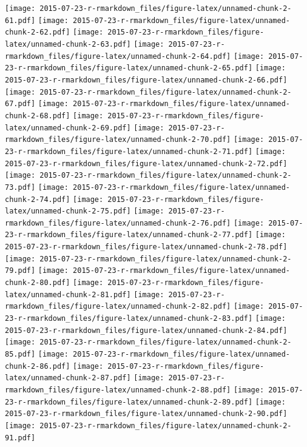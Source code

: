\documentclass[
]{article}
\begin{document}
\texttt{[image: 2015-07-23-r-rmarkdown\_files/figure-latex/unnamed-chunk-2-61.pdf]}
\texttt{[image: 2015-07-23-r-rmarkdown\_files/figure-latex/unnamed-chunk-2-62.pdf]}
\texttt{[image: 2015-07-23-r-rmarkdown\_files/figure-latex/unnamed-chunk-2-63.pdf]}
\texttt{[image: 2015-07-23-r-rmarkdown\_files/figure-latex/unnamed-chunk-2-64.pdf]}
\texttt{[image: 2015-07-23-r-rmarkdown\_files/figure-latex/unnamed-chunk-2-65.pdf]}
\texttt{[image: 2015-07-23-r-rmarkdown\_files/figure-latex/unnamed-chunk-2-66.pdf]}
\texttt{[image: 2015-07-23-r-rmarkdown\_files/figure-latex/unnamed-chunk-2-67.pdf]}
\texttt{[image: 2015-07-23-r-rmarkdown\_files/figure-latex/unnamed-chunk-2-68.pdf]}
\texttt{[image: 2015-07-23-r-rmarkdown\_files/figure-latex/unnamed-chunk-2-69.pdf]}
\texttt{[image: 2015-07-23-r-rmarkdown\_files/figure-latex/unnamed-chunk-2-70.pdf]}
\texttt{[image: 2015-07-23-r-rmarkdown\_files/figure-latex/unnamed-chunk-2-71.pdf]}
\texttt{[image: 2015-07-23-r-rmarkdown\_files/figure-latex/unnamed-chunk-2-72.pdf]}
\texttt{[image: 2015-07-23-r-rmarkdown\_files/figure-latex/unnamed-chunk-2-73.pdf]}
\texttt{[image: 2015-07-23-r-rmarkdown\_files/figure-latex/unnamed-chunk-2-74.pdf]}
\texttt{[image: 2015-07-23-r-rmarkdown\_files/figure-latex/unnamed-chunk-2-75.pdf]}
\texttt{[image: 2015-07-23-r-rmarkdown\_files/figure-latex/unnamed-chunk-2-76.pdf]}
\texttt{[image: 2015-07-23-r-rmarkdown\_files/figure-latex/unnamed-chunk-2-77.pdf]}
\texttt{[image: 2015-07-23-r-rmarkdown\_files/figure-latex/unnamed-chunk-2-78.pdf]}
\texttt{[image: 2015-07-23-r-rmarkdown\_files/figure-latex/unnamed-chunk-2-79.pdf]}
\texttt{[image: 2015-07-23-r-rmarkdown\_files/figure-latex/unnamed-chunk-2-80.pdf]}
\texttt{[image: 2015-07-23-r-rmarkdown\_files/figure-latex/unnamed-chunk-2-81.pdf]}
\texttt{[image: 2015-07-23-r-rmarkdown\_files/figure-latex/unnamed-chunk-2-82.pdf]}
\texttt{[image: 2015-07-23-r-rmarkdown\_files/figure-latex/unnamed-chunk-2-83.pdf]}
\texttt{[image: 2015-07-23-r-rmarkdown\_files/figure-latex/unnamed-chunk-2-84.pdf]}
\texttt{[image: 2015-07-23-r-rmarkdown\_files/figure-latex/unnamed-chunk-2-85.pdf]}
\texttt{[image: 2015-07-23-r-rmarkdown\_files/figure-latex/unnamed-chunk-2-86.pdf]}
\texttt{[image: 2015-07-23-r-rmarkdown\_files/figure-latex/unnamed-chunk-2-87.pdf]}
\texttt{[image: 2015-07-23-r-rmarkdown\_files/figure-latex/unnamed-chunk-2-88.pdf]}
\texttt{[image: 2015-07-23-r-rmarkdown\_files/figure-latex/unnamed-chunk-2-89.pdf]}
\texttt{[image: 2015-07-23-r-rmarkdown\_files/figure-latex/unnamed-chunk-2-90.pdf]}
\texttt{[image: 2015-07-23-r-rmarkdown\_files/figure-latex/unnamed-chunk-2-91.pdf]}
\end{document}
